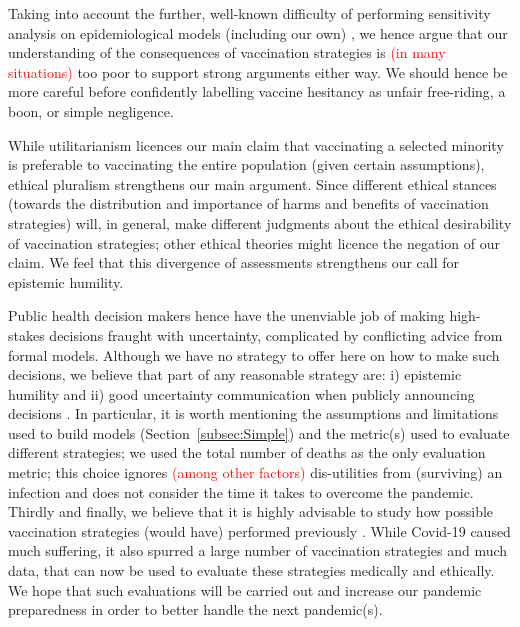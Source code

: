 \documentclass[a4paper,12pt]{article}
\newcommand{\ignacio}[1]{\textcolor{red}{#1}}
\begin{document}
Taking into account the further, well-known difficulty of performing sensitivity analysis on epidemiological models (including our own) \cite{Edeling2021}, we hence argue that our understanding of the consequences of vaccination strategies is \ignacio{(in many situations)} too poor to support strong arguments either way. We should hence be more careful before confidently labelling vaccine hesitancy as unfair free-riding, a boon, or simple negligence. 

While utilitarianism licences our main claim that vaccinating a selected minority is preferable to vaccinating the entire population (given certain assumptions), ethical pluralism strengthens our main argument. Since different ethical stances (towards the distribution and importance of harms and benefits of vaccination strategies) will, in general, make different judgments about the ethical desirability of vaccination strategies; other ethical theories might licence the negation of our claim. We feel that this divergence of assessments strengthens our call for epistemic humility.

Public health decision makers hence have the unenviable job of making high-stakes decisions fraught with uncertainty, complicated by conflicting advice from formal models. Although we have no strategy to offer here on how to make such decisions, we believe that part of any reasonable strategy are: i) epistemic humility and ii) good uncertainty communication when publicly announcing decisions \cite{Friedman2023,Giubilini2025,Intemann2023,Nguyen2024,Nutbeam2020,OjeaQuintana2021}. In particular, it is worth mentioning the assumptions and limitations used to build models (Section~\ref{subsec:Simple}) and the metric(s) used to evaluate different strategies; we used the total number of deaths as the only evaluation metric; this choice ignores \ignacio{(among other factors)} dis-utilities from (surviving) an infection and does not consider the time it takes to overcome the pandemic. Thirdly and finally, we believe that it is highly advisable to study how possible vaccination strategies (would have) performed previously \cite{Thompson2013}. While Covid-19 caused much suffering, it also spurred a large number of vaccination strategies and much data, that can now be used to evaluate these strategies medically and ethically. We hope that such evaluations will be carried out and increase our pandemic preparedness in order to better handle the next pandemic(s).
\end{document}
